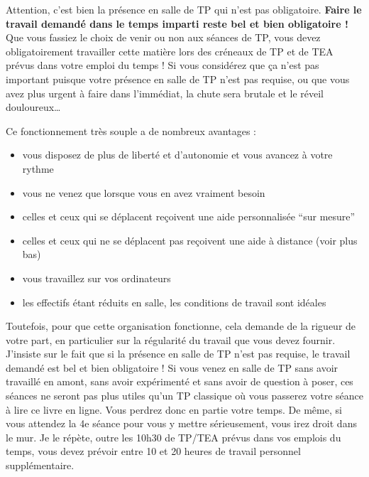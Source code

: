 \documentclass[
  a4paper,
  DIV=11,
  numbers=noendperiod,
  oneside]{scrreprt}
\providecommand{\tightlist}{%
  \setlength{\itemsep}{0pt}\setlength{\parskip}{0pt}}\usepackage{longtable,booktabs,array}
\begin{document}
\begin{tcolorbox}[enhanced jigsaw, arc=.35mm, opacityback=0, colbacktitle=quarto-callout-important-color!10!white, bottomrule=.15mm, coltitle=black, colframe=quarto-callout-important-color-frame, breakable, toprule=.15mm, title=\textcolor{quarto-callout-important-color}{\faExclamation}\hspace{0.5em}{Important}, leftrule=.75mm, titlerule=0mm, bottomtitle=1mm, toptitle=1mm, left=2mm, rightrule=.15mm, opacitybacktitle=0.6, colback=white]

Attention, c'est bien la présence en salle de TP qui n'est pas
obligatoire. \textbf{Faire le travail demandé dans le temps imparti
reste bel et bien obligatoire !} Que vous fassiez le choix de venir ou
non aux séances de TP, vous devez obligatoirement travailler cette
matière lors des créneaux de TP et de TEA prévus dans votre emploi du
temps ! Si vous considérez que ça n'est pas important puisque votre
présence en salle de TP n'est pas requise, ou que vous avez plus urgent
à faire dans l'immédiat, la chute sera brutale et le réveil
douloureux\ldots{}

\end{tcolorbox}

Ce fonctionnement très souple a de nombreux avantages :

\begin{itemize}
\tightlist
\item
  vous disposez de plus de liberté et d'autonomie et vous avancez à
  votre rythme
\item
  vous ne venez que lorsque vous en avez vraiment besoin
\item
  celles et ceux qui se déplacent reçoivent une aide personnalisée ``sur
  mesure''
\item
  celles et ceux qui ne se déplacent pas reçoivent une aide à distance
  (voir plus bas)
\item
  vous travaillez sur vos ordinateurs
\item
  les effectifs étant réduits en salle, les conditions de travail sont
  idéales
\end{itemize}

Toutefois, pour que cette organisation fonctionne, cela demande de la
rigueur de votre part, en particulier sur la régularité du travail que
vous devez fournir. J'insiste sur le fait que si la présence en salle de
TP n'est pas requise, le travail demandé est bel et bien obligatoire !
Si vous venez en salle de TP sans avoir travaillé en amont, sans avoir
expérimenté et sans avoir de question à poser, ces séances ne seront pas
plus utiles qu'un TP classique où vous passerez votre séance à lire ce
livre en ligne. Vous perdrez donc en partie votre temps. De même, si
vous attendez la 4e séance pour vous y mettre sérieusement, vous irez
droit dans le mur. Je le répète, outre les 10h30 de TP/TEA prévus dans
vos emplois du temps, vous devez prévoir entre 10 et 20 heures de
travail personnel supplémentaire.
\end{document}
